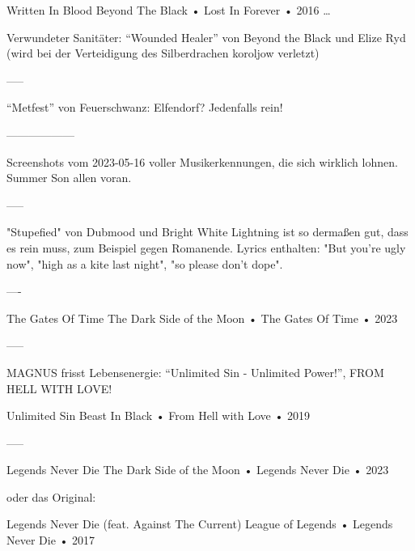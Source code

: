 Written In Blood Beyond The Black • Lost In Forever • 2016
…








Verwundeter Sanitäter: “Wounded Healer” von Beyond the Black und Elize Ryd
(wird bei der Verteidigung des Silberdrachen koroljow verletzt)


—--








“Metfest” von Feuerschwanz: Elfendorf?
Jedenfalls rein!




—---------------














Screenshots vom 2023-05-16 voller Musikerkennungen, die sich wirklich lohnen.
Summer Son allen voran.




—--


"Stupefied" von Dubmood und Bright White Lightning ist so dermaßen gut, dass es rein muss, zum Beispiel gegen Romanende. Lyrics enthalten: "But you're ugly now", "high as a kite last night", "so please don't dope".


—-




The Gates Of Time
The Dark Side of the Moon
 •
The Gates Of Time
 • 2023










—--


MAGNUS frisst Lebensenergie:
“Unlimited Sin - Unlimited Power!”, FROM HELL WITH LOVE!


Unlimited Sin
Beast In Black
 •
From Hell with Love
 •
2019








—--


Legends Never Die
The Dark Side of the Moon
 •
Legends Never Die
 •
2023


oder das Original:


Legends Never Die (feat. Against The Current)
League of Legends
 •
Legends Never Die
 •
2017






